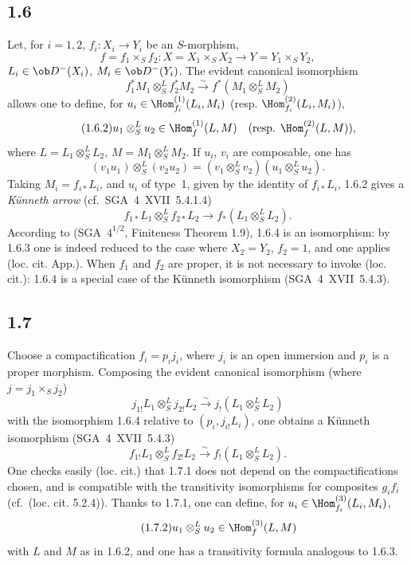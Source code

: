 \subsection*{1.6}
Let, for $i=1,2$, $f_i:X_i\to Y_i$ be an $S$-morphism,
\[
f=f_1\times_Sf_2:X=X_1\times_SX_2\to Y=Y_1\times_SY_2,
\]
$L_i\in\ob D^{-}(X_i)$, $M_i\in\ob D^{-}(Y_i)$. The evident canonical isomorphism
\begin{equation}\tag{1.6.1}
f_1^{*}M_1\otimes^L_Sf_2^{*}M_2\xrightarrow{\sim}f^{*}(M_1\otimes^L_SM_2)
\end{equation}
allows one to define, for $u_i\in\Hom_{f_i}^{(1)}(L_i,M_i)$ (resp. $\Hom_{f_i}^{(2)}(L_i,M_i)$),
\begin{equation}\tag{1.6.2}
u_1\otimes^L_Su_2\in\Hom_f^{(1)}(L,M)\quad(\text{resp. }\Hom_f^{(2)}(L,M)),
\end{equation}
where $L=L_1\otimes^L_SL_2$, $M=M_1\otimes^L_SM_2$. If $u_i$, $v_i$ are composable, one has
\begin{equation}\tag{1.6.3}
(v_1u_1)\otimes^L_S(v_2u_2)=(v_1\otimes^L_Sv_2)(u_1\otimes^L_Su_2).
\end{equation}
Taking $M_i=f_{i*}L_i$, and $u_i$ of type~1, given by the identity of $f_{i*}L_i$, 1.6.2 gives a \emph{Künneth arrow} (cf.~SGA~4~XVII~5.4.1.4)
\begin{equation}\tag{1.6.4}
f_{1*}L_1\otimes^L_Sf_{2*}L_2\longrightarrow f_{*}(L_1\otimes^L_SL_2).
\end{equation}
According to (SGA~$4^{1/2}$, Finiteness Theorem 1.9), 1.6.4 is an isomorphism: by 1.6.3 one is indeed reduced to the case where $X_2=Y_2$, $f_2=1$, and one applies (loc. cit. App.). When $f_1$ and $f_2$ are proper, it is not necessary to invoke (loc. cit.): 1.6.4 is a special case of the Künneth isomorphism (SGA~4~XVII~5.4.3).

\subsection*{1.7}
Choose a compactification $f_i=p_i j_i$, where $j_i$ is an open immersion and $p_i$ is a proper morphism. Composing the evident canonical isomorphism (where $j=j_1\times_Sj_2$)
\[
j_{1!}L_1\otimes^L_Sj_{2!}L_2\xrightarrow{\sim}j_{!}(L_1\otimes^L_SL_2)
\]
with the isomorphism 1.6.4 relative to $(p_i,j_{i!}L_i)$, one obtains a Künneth isomorphism (SGA~4~XVII~5.4.3)
\begin{equation}\tag{1.7.1}
f_{1!}L_1\otimes^L_Sf_{2!}L_2\xrightarrow{\sim}f_{!}(L_1\otimes^L_SL_2).
\end{equation}
One checks easily (loc. cit.) that 1.7.1 does not depend on the compactifications chosen, and is compatible with the transitivity isomorphisms for composites $g_if_i$ (cf.~(loc. cit. 5.2.4)). Thanks to 1.7.1, one can define, for $u_i\in\Hom_{f_i}^{(3)}(L_i,M_i)$,
\begin{equation}\tag{1.7.2}
u_1\otimes^L_Su_2\in\Hom_f^{(3)}(L,M)
\end{equation}
with $L$ and $M$ as in 1.6.2, and one has a transitivity formula analogous to 1.6.3.

